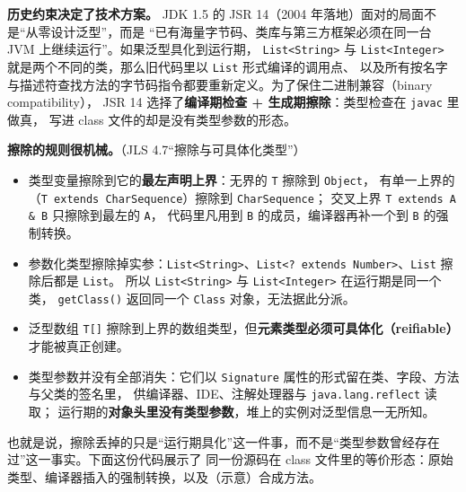 \documentclass[12pt,a4paper,fontset=fandol]{ctexbook}
\newcommand{\kw}[1]{\texttt{#1}}
\begin{document}
\textbf{历史约束决定了技术方案。} JDK 1.5 的 JSR 14（2004 年落地）面对的局面不是“从零设计泛型”，而是
“已有海量字节码、类库与第三方框架必须在同一台 JVM 上继续运行”。如果泛型具化到运行期，
\kw{List<String>} 与 \kw{List<Integer>} 就是两个不同的类，那么旧代码里以 \kw{List} 形式编译的调用点、
以及所有按名字与描述符查找方法的字节码指令都要重新定义。为了保住二进制兼容（binary compatibility），
JSR 14 选择了\textbf{编译期检查 + 生成期擦除}：类型检查在 \kw{javac} 里做真，
写进 class 文件的却是没有类型参数的形态。

\textbf{擦除的规则很机械。}（JLS 4.7“擦除与可具体化类型”）

\begin{itemize}
  \item 类型变量擦除到它的\textbf{最左声明上界}：无界的 \kw{T} 擦除到 \kw{Object}，
        有单一上界的（\kw{T extends CharSequence}）擦除到 \kw{CharSequence}；
        交叉上界 \kw{T extends A \& B} 只擦除到最左的 \kw{A}，
        代码里凡用到 \kw{B} 的成员，编译器再补一个到 \kw{B} 的强制转换。
  \item 参数化类型擦除掉实参：\kw{List<String>}、\kw{List<? extends Number>}、\kw{List} 擦除后都是 \kw{List}。
        所以 \kw{List<String>} 与 \kw{List<Integer>} 在运行期是同一个类，
        \kw{getClass()} 返回同一个 \kw{Class} 对象，无法据此分派。
  \item 泛型数组 \kw{T[]} 擦除到上界的数组类型，但\textbf{元素类型必须可具体化（reifiable）}才能被真正创建。
  \item 类型参数并没有全部消失：它们以 \kw{Signature} 属性的形式留在类、字段、方法与父类的签名里，
        供编译器、IDE、注解处理器与 \kw{java.lang.reflect} 读取；
        运行期的\textbf{对象头里没有类型参数}，堆上的实例对泛型信息一无所知。
\end{itemize}

也就是说，擦除丢掉的只是“运行期具化”这一件事，而不是“类型参数曾经存在过”这一事实。下面这份代码展示了
同一份源码在 class 文件里的等价形态：原始类型、编译器插入的强制转换，以及（示意）合成方法。
\end{document}
